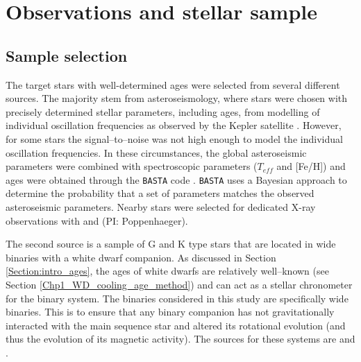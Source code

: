 \section{Observations and stellar sample}
\subsection{Sample selection}
\label{Section_sample_selection}
The target stars with well-determined ages were selected from several different sources. The majority stem from asteroseismology, where stars were chosen with precisely determined stellar parameters, including ages, from modelling of individual oscillation frequencies as observed by the Kepler satellite \citep{Silva_Aguirre_etal_2015,Silva_Aguirre_etal_2017}. However, for some stars the signal--to--noise was not high enough to model the individual oscillation frequencies. In these circumstances, the global asteroseismic parameters \citep{Chaplin_etal_2014} were combined with spectroscopic parameters ($T_{eff}$ and [Fe/H]) \citep{Buchhave_Latham_2015} and ages were obtained through the \texttt{BASTA} code \citep{Silva_Aguirre_etal_2015}. \texttt{BASTA} uses a Bayesian approach to determine the probability that a set of parameters matches the observed asteroseismic parameters. Nearby stars were selected for dedicated X-ray observations with \XMM and \Chandra (PI: Poppenhaeger).

The second source is a sample of G and K type stars that are located in wide binaries with a white dwarf companion. As discussed in Section \ref{Section:intro_ages}, the ages of white dwarfs are relatively well--known (see Section \ref{Chp1_WD_cooling_age_method}) and can act as a stellar chronometer for the binary system. The binaries considered in this study are specifically wide binaries. This is to ensure that any binary companion has not gravitationally interacted with the main sequence star and altered its rotational evolution (and thus the evolution of its magnetic activity). The sources for these systems are \citet{Garces_etal_2011} and \citet{Zhao_etal_2012}.

